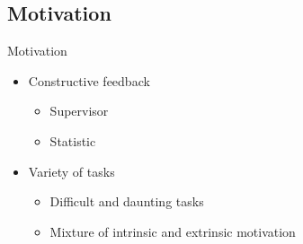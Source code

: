 \subsection{Motivation}
\begin{frame}{Motivation}{}
    \begin{itemize}
        \item Constructive feedback
            \begin{itemize}
                \item Supervisor
                \item Statistic
            \end{itemize}
        \item Variety of tasks
            \begin{itemize}
                \item Difficult and daunting tasks
                \item Mixture of intrinsic and extrinsic motivation
            \end{itemize}
    \end{itemize}
\end{frame}